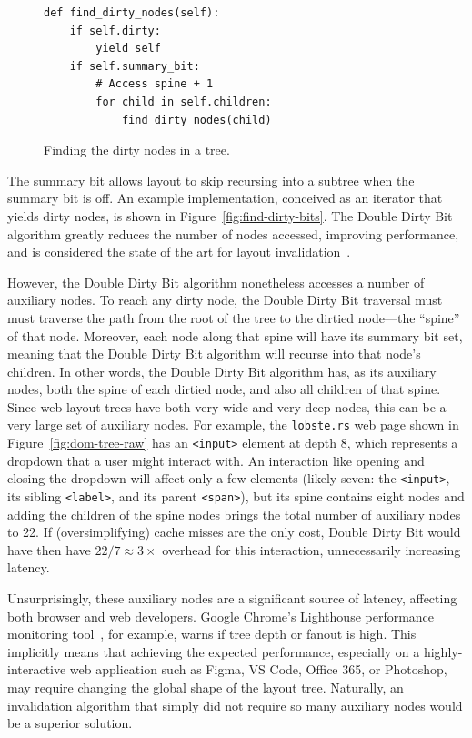 \begin{figure}
\begin{verbatim}
def find_dirty_nodes(self):
    if self.dirty:
        yield self
    if self.summary_bit:
        # Access spine + 1
        for child in self.children:
            find_dirty_nodes(child)
\end{verbatim}
\caption{Finding the dirty nodes in a tree.}
\label{fig:find-dirty-nodes}
\end{figure}

The summary bit allows layout to skip recursing into a subtree
  when the summary bit is off.
An example implementation, conceived as an iterator
  that yields dirty nodes,
  is shown in Figure~\ref{fig:find-dirty-bits}.
The Double Dirty Bit algorithm
  greatly reduces the number of nodes accessed,
  improving performance,
  and is considered the state of the art
  for layout invalidation~\cite{tali-garseil,wbe}.

However, the Double Dirty Bit algorithm
  nonetheless accesses a number of auxiliary nodes.
To reach any dirty node,
  the Double Dirty Bit traversal must
  must traverse the path from the root of the tree
  to the dirtied node---the ``spine'' of that node.
Moreover, each node along that spine
  will have its summary bit set,
  meaning that the Double Dirty Bit algorithm will recurse
  into that node's children.
In other words,
  the Double Dirty Bit algorithm has, as its auxiliary nodes,
  both the spine of each dirtied node,
  and also all children of that spine.
Since web layout trees have both very wide and very deep nodes,
  this can be a very large set of auxiliary nodes.
For example, the \texttt{lobste.rs} web page
  shown in Figure~\ref{fig:dom-tree-raw}
  has an \texttt{<input>} element at depth 8,
  which represents a dropdown that a user might interact with.
An interaction like opening and closing the dropdown
  will affect only a few elements
  (likely seven:
    the \texttt{<input>},
    its sibling \texttt{<label>},
    and its parent \texttt{<span>}),
  but its spine contains eight nodes
  and adding the children of the spine nodes
  brings the total number of auxiliary nodes to 22.
If (oversimplifying) cache misses are the only cost,
  Double Dirty Bit would have then have
  $22 / 7 \approx 3\times$ overhead for this interaction,
  unnecessarily increasing latency.

Unsurprisingly, these auxiliary nodes
  are a significant source of latency,
  affecting both browser and web developers.
Google Chrome's Lighthouse performance monitoring tool~\cite{lighthouse},
  for example, warns if tree depth or fanout is high.
This implicitly means that achieving the expected performance,
  especially on a highly-interactive web application
  such as Figma, VS Code, Office 365, or Photoshop,
  may require changing the global shape of the layout tree.
Naturally, an invalidation algorithm that simply
  did not require so many auxiliary nodes
  would be a superior solution.

